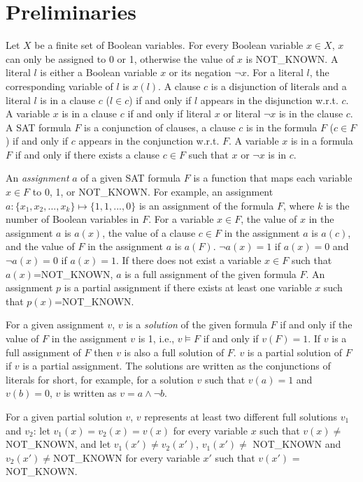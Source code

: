 \section{Preliminaries} \label{sec:prel}
Let $X$ be a finite set of Boolean variables. For every Boolean variable $x\in X$, $x$ can only be assigned to 0 or 1, otherwise the value of $x$ is NOT\_KNOWN.
A literal $l$ is either a Boolean variable $x$ or its negation $\neg x$. For a literal $l$, the corresponding variable of $l$ is $x(l)$.
A clause $c$ is a disjunction of literals and a literal $l$ is in a clause $c$ ($l\in c$) if and only if $l$ appears in the disjunction w.r.t. $c$. A variable $x$ is in a clause $c$ if and only if literal $x$ or literal $\neg x$ is in the clause $c$.
A SAT formula $F$ is a conjunction of clauses, a clause $c$ is in the formula $F$ ($c\in F$) if and only if $c$ appears in the conjunction w.r.t. $F$. A variable $x$ is in a formula $F$ if and only if there exists a clause $c\in F$ such that $x$ or $\neg x$ is in $c$. 

An \emph{assignment} $a$ of a given SAT formula $F$ is a function that maps each variable $x\in F$ to 0, 1, or NOT\_KNOWN. 
For example, an assignment $a: \{x_1, x_2, ..., x_k\} \mapsto \{1, 1, ..., 0\}$ is an assignment of the formula $F$, where $k$ is the number of Boolean variables in $F$. 
For a variable $x\in F$, the value of $x$ in the assignment $a$ is $a(x)$, the value of a clause $c\in F$ in the assignment $a$ is $a(c)$, and the value of $F$ in the assignment $a$ is $a(F)$.
$\neg a(x)=1$ if $a(x)=0$ and $\neg a(x)=0$ if $a(x)=1$.
If there does not exist a variable $x\in F$ such that $a(x)$=NOT\_KNOWN, $a$ is a full assignment of the given formula $F$. 
An assignment $p$ is a partial assignment if there exists at least one variable $x$ such that $p(x)$=NOT\_KNOWN.

For a given assignment $v$, $v$ is a \emph{solution} of the given formula $F$ if and only if the value of $F$ in the assignment $v$ is 1, i.e., $v\models F$ if and only if $v(F)=1$. If $v$ is a full assignment of $F$ then $v$ is also a full solution of $F$. $v$ is a partial solution of $F$ if $v$ is a partial assignment.
The solutions are written as the conjunctions of literals for short, for example, for a solution $v$ such that $v(a)=1$ and $v(b)=0$, $v$ is written as $v=a\wedge \neg b$.

For a given partial solution $v$, $v$ represents at least two different full solutions $v_1$ and $v_2$: let $v_1(x) = v_2(x) = v(x)$ for every variable $x$ such that $v(x) \neq $NOT\_KNOWN, and let $v_1(x') \neq v_2(x')$, $v_1(x') \neq $ NOT\_KNOWN and $v_2(x') \neq $NOT\_KNOWN for every variable $x'$ such that $v(x')$ = NOT\_KNOWN.

